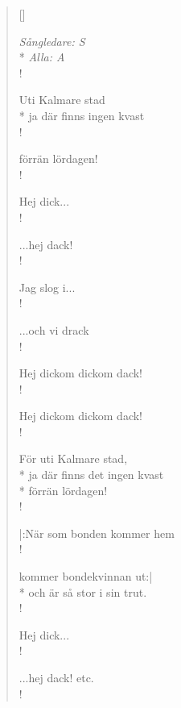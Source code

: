 
\settowidth{\versewidth}{Hej dickom dickom dack!}



\begin{verse}[\versewidth]

\flagverse{}
\emph{Sångledare: S}\\*
\emph{Alla: A}\\!

Uti Kalmare stad\\*
ja där finns ingen kvast\\!

förrän lördagen!\\!

Hej dick...\\!

...hej dack!\\!

Jag slog i...\\!

...och vi drack\\!

Hej dickom dickom dack!\\!

Hej dickom dickom dack!\\!

För uti Kalmare stad,\\*
ja där finns det ingen kvast\\*
förrän lördagen!\\!

|:När som bonden kommer hem\\!

kommer bondekvinnan ut:|\\*
och är så stor i sin trut.\\!


Hej dick...\\!

...hej dack! etc.\\!


\end{verse}
